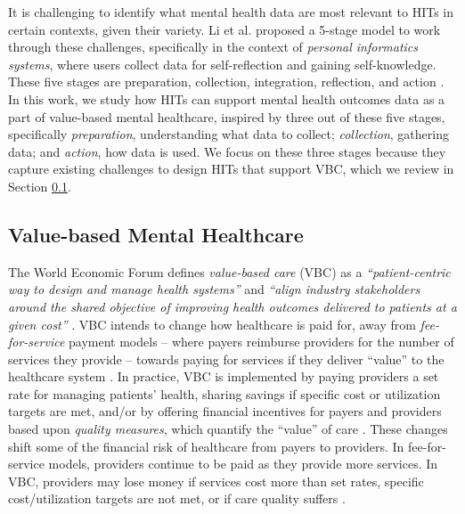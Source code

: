 It is challenging to identify what mental health data are most relevant to HITs in certain contexts, given their variety.
Li et al. proposed a 5-stage model to work through these challenges, specifically in the context of \textit{personal informatics systems}, where users collect data for self-reflection and gaining self-knowledge.
These five stages are preparation, collection, integration, reflection, and action \cite{li_stage-based_2010}.
In this work, we study how HITs can support mental health outcomes data as a part of value-based mental healthcare, inspired by three out of these five stages, specifically \textit{preparation}, understanding what data to collect; \textit{collection}, gathering data; and \textit{action}, how data is used.
We focus on these three stages because they capture existing challenges to design HITs that support VBC, which we review in Section \ref{sec:rw:vbc}.

\subsection{Value-based Mental Healthcare}
\label{sec:rw:vbc}
The World Economic Forum defines \textit{value-based care} (VBC) as a \textit{``patient-centric way to design and manage health systems''} and \textit{``align industry stakeholders around the shared objective of improving health outcomes delivered to patients at a given cost''} \cite{world_economic_forum_value_2017}.
VBC intends to change how healthcare is paid for, away from \textit{fee-for-service} payment models -- where payers reimburse providers for the number of services they provide -- towards paying for services if they deliver ``value'' to the healthcare system \cite{brown_key_2017}.
In practice, VBC is implemented by paying providers a set rate for managing patients' health, sharing savings if specific cost or utilization targets are met, and/or by offering financial incentives for payers and providers based upon \textit{quality measures}, which quantify the ``value'' of care \cite{world_economic_forum_moment_2023, health_care_payment_learning__action_network_alternative_2017}.
These changes shift some of the financial risk of healthcare from payers to providers.
In fee-for-service models, providers continue to be paid as they provide more services.
In VBC, providers may lose money if services cost more than set rates, specific cost/utilization targets are not met, or if care quality suffers \cite{novikov_historical_2018, health_care_payment_learning__action_network_alternative_2017}.

